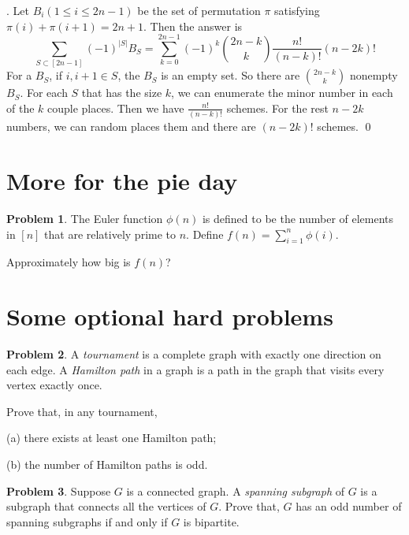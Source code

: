\documentclass[12pt]{article}
\providecommand{\abs}[1]{\lvert#1\rvert}
\theoremstyle{definition}
\newtheorem{hw}{Problem}
\newenvironment{sol}
  {\par\vspace{3mm}\noindent{\it Solution}.}
  {\qed}
\begin{document}
\begin{sol}
	Let $B_i (1 \leq i \leq 2n-1)$ be the set of permutation $\pi$ satisfying $\pi(i) + \pi(i+1) = 2n + 1$. Then the answer is 
	$$
		\sum_{S \subset [2n-1]}(-1)^{\abs{S}}B_S = \sum_{k = 0}^{2n-1}(-1)^k\binom{2n-k}{k}\frac{n!}{(n-k)!}(n-2k)!
	$$
	For a $B_S$, if $i,i+1 \in S$, the $B_S$ is an empty set. So there are $\binom{2n-k}{k}$ nonempty $B_S$. For each $S$ that has the size $k$, we can enumerate the minor number in each of the $k$ couple places. Then we have $\frac{n!}{(n-k)!}$ schemes. For the rest $n-2k$ numbers, we can random places them and there are $(n-2k)!$ schemes. 
\end{sol}

\section{More for the pie day}

\begin{hw}
The Euler function $\phi(n)$ is defined to be the number of elements
in $[n]$ that are relatively prime to $n$. Define $f(n)= \sum_{i=1}^n
\phi(i)$.

Approximately how big is $f(n)$?
\end{hw}

\section{Some optional hard problems}

\begin{hw}
A {\em tournament} is a complete graph with exactly one direction on
each edge.
A {\em Hamilton path} in a graph is a path in the graph that visits
every vertex exactly once.

Prove that, in any tournament,

(a) there exists at least one Hamilton path;

(b) the number of Hamilton paths is odd.

\end{hw}

\begin{hw}
Suppose $G$ is a connected graph. A {\em spanning subgraph} of $G$ is
a subgraph that connects all the vertices of $G$. Prove that,
$G$ has an odd number of spanning subgraphs if and only if
$G$ is bipartite.
\end{hw}
\end{document}
